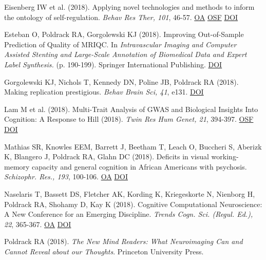 Eisenberg IW et al. (2018). Applying novel technologies and methods to inform the ontology of self-regulation. \textit{Behav Res Ther, 101}, 46-57. \href{https://www.ncbi.nlm.nih.gov/pmc/articles/PMC5801197}{OA} \href{https://osf.io/amxpv/}{OSF} \href{http://dx.doi.org/10.1016/j.brat.2017.09.014}{DOI} \vspace{2mm}

Esteban O, Poldrack RA, Gorgolewski KJ (2018). Improving Out-of-Sample Prediction of Quality of MRIQC. In \textit{Intravascular Imaging and Computer Assisted Stenting and Large-Scale Annotation of Biomedical Data and Expert Label Synthesis.} (p. 190-199). Springer International Publishing. \href{http://dx.doi.org/10.1007/978-3-030-01364-6\_21}{DOI} \vspace{2mm}

Gorgolewski KJ, Nichols T, Kennedy DN, Poline JB, Poldrack RA (2018). Making replication prestigious. \textit{Behav Brain Sci, 41}, e131. \href{http://dx.doi.org/10.1017/s0140525x18000663}{DOI} \vspace{2mm}

Lam M et al. (2018). Multi-Trait Analysis of GWAS and Biological Insights Into Cognition: A Response to Hill (2018). \textit{Twin Res Hum Genet, 21}, 394-397. \href{https://osf.io/t5kzx/}{OSF} \href{http://dx.doi.org/10.1017/thg.2018.46}{DOI} \vspace{2mm}

Mathias SR, Knowles EEM, Barrett J, Beetham T, Leach O, Buccheri S, Aberizk K, Blangero J, Poldrack RA, Glahn DC (2018). Deficits in visual working-memory capacity and general cognition in African Americans with psychosis. \textit{Schizophr. Res., 193}, 100-106. \href{https://www.ncbi.nlm.nih.gov/pmc/articles/PMC5825248}{OA} \href{http://dx.doi.org/10.1016/j.schres.2017.08.015}{DOI} \vspace{2mm}

Naselaris T, Bassett DS, Fletcher AK, Kording K, Kriegeskorte N, Nienborg H, Poldrack RA, Shohamy D, Kay K (2018). Cognitive Computational Neuroscience: A New Conference for an Emerging Discipline. \textit{Trends Cogn. Sci. (Regul. Ed.), 22}, 365-367. \href{https://www.ncbi.nlm.nih.gov/pmc/articles/PMC5911192}{OA} \href{http://dx.doi.org/10.1016/j.tics.2018.02.008}{DOI} \vspace{2mm}

Poldrack RA (2018).  \textit{The New Mind Readers: What Neuroimaging Can and Cannot Reveal about our Thoughts}. Princeton University Press. \vspace{2mm}

